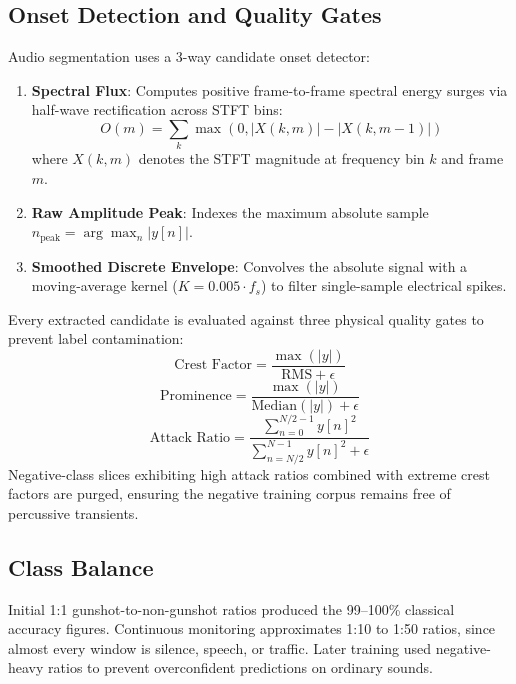 \documentclass[conference]{IEEEtran}
\begin{document}
\subsection{Onset Detection and Quality Gates}
Audio segmentation uses a 3-way candidate onset detector:
\begin{enumerate}
    \item \textbf{Spectral Flux}: Computes positive frame-to-frame spectral energy surges via half-wave rectification across STFT bins:
    \begin{equation}
        O(m) = \sum_{k} \max\left(0, |X(k, m)| - |X(k, m\!-\!1)|\right)
        \label{eq:spectral_flux}
    \end{equation}
    where $X(k, m)$ denotes the STFT magnitude at frequency bin $k$ and frame $m$.
    \item \textbf{Raw Amplitude Peak}: Indexes the maximum absolute sample $n_{\text{peak}} = \arg\max_n |y[n]|$.
    \item \textbf{Smoothed Discrete Envelope}: Convolves the absolute signal with a moving-average kernel ($K = 0.005 \cdot f_s$) to filter single-sample electrical spikes.
\end{enumerate}

Every extracted candidate is evaluated against three physical quality gates to prevent label contamination:
\begin{equation}
    \text{Crest Factor} = \frac{\max(|y|)}{\text{RMS} + \epsilon}
    \label{eq:crest_factor}
\end{equation}
\begin{equation}
    \text{Prominence} = \frac{\max(|y|)}{\text{Median}(|y|) + \epsilon}
    \label{eq:prominence}
\end{equation}
\begin{equation}
    \text{Attack Ratio} = \frac{\sum_{n=0}^{N/2-1} y[n]^2}{\sum_{n=N/2}^{N-1} y[n]^2 + \epsilon}
    \label{eq:attack_ratio}
\end{equation}
Negative-class slices exhibiting high attack ratios combined with extreme crest factors are purged, ensuring the negative training corpus remains free of percussive transients.

\subsection{Class Balance}
Initial 1:1 gunshot-to-non-gunshot ratios produced the 99--100\% classical accuracy figures. Continuous monitoring approximates 1:10 to 1:50 ratios, since almost every window is silence, speech, or traffic. Later training used negative-heavy ratios to prevent overconfident predictions on ordinary sounds.
\end{document}
